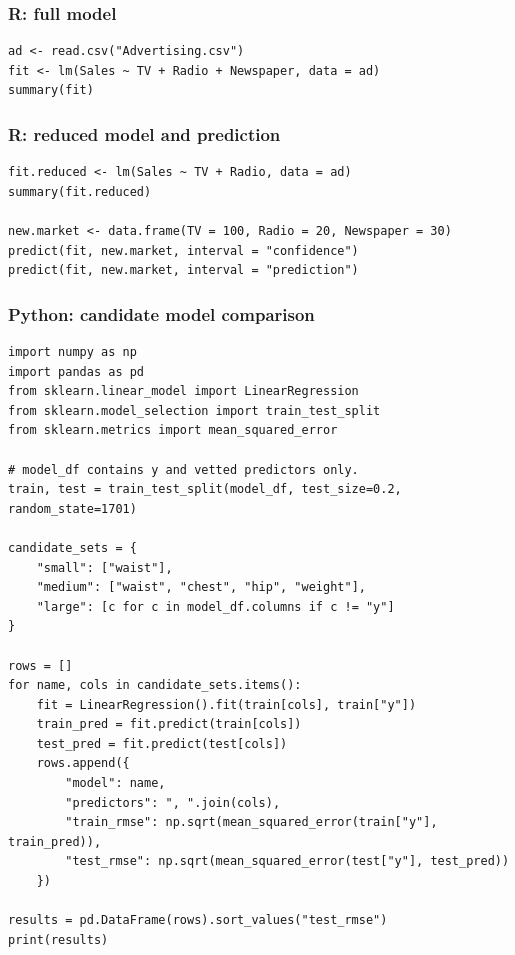 \subsubsection*{R: full model}

\begin{verbatim}
ad <- read.csv("Advertising.csv")
fit <- lm(Sales ~ TV + Radio + Newspaper, data = ad)
summary(fit)
\end{verbatim}

\subsubsection*{R: reduced model and prediction}

\begin{verbatim}
fit.reduced <- lm(Sales ~ TV + Radio, data = ad)
summary(fit.reduced)

new.market <- data.frame(TV = 100, Radio = 20, Newspaper = 30)
predict(fit, new.market, interval = "confidence")
predict(fit, new.market, interval = "prediction")
\end{verbatim}

\subsubsection*{Python: candidate model comparison}

\begin{verbatim}
import numpy as np
import pandas as pd
from sklearn.linear_model import LinearRegression
from sklearn.model_selection import train_test_split
from sklearn.metrics import mean_squared_error

# model_df contains y and vetted predictors only.
train, test = train_test_split(model_df, test_size=0.2, random_state=1701)

candidate_sets = {
    "small": ["waist"],
    "medium": ["waist", "chest", "hip", "weight"],
    "large": [c for c in model_df.columns if c != "y"]
}

rows = []
for name, cols in candidate_sets.items():
    fit = LinearRegression().fit(train[cols], train["y"])
    train_pred = fit.predict(train[cols])
    test_pred = fit.predict(test[cols])
    rows.append({
        "model": name,
        "predictors": ", ".join(cols),
        "train_rmse": np.sqrt(mean_squared_error(train["y"], train_pred)),
        "test_rmse": np.sqrt(mean_squared_error(test["y"], test_pred))
    })

results = pd.DataFrame(rows).sort_values("test_rmse")
print(results)
\end{verbatim}

